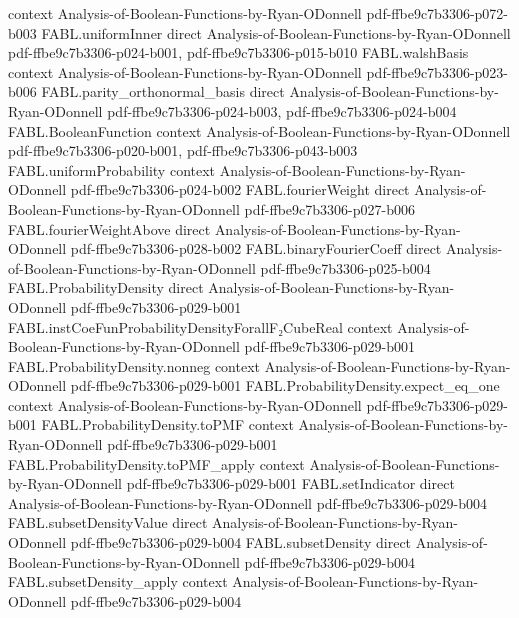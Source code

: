 \begin{theorem}
  {context}
  {Analysis-of-Boolean-Functions-by-Ryan-ODonnell}
  {pdf-ffbe9c7b3306-p072-b003}
\proofstep
  {FABL.uniformInner}
  {direct}
  {Analysis-of-Boolean-Functions-by-Ryan-ODonnell}
  {pdf-ffbe9c7b3306-p024-b001,
    pdf-ffbe9c7b3306-p015-b010}
\proofstep
  {FABL.walshBasis}
  {context}
  {Analysis-of-Boolean-Functions-by-Ryan-ODonnell}
  {pdf-ffbe9c7b3306-p023-b006}
\proofstep
  {FABL.parity_orthonormal_basis}
  {direct}
  {Analysis-of-Boolean-Functions-by-Ryan-ODonnell}
  {pdf-ffbe9c7b3306-p024-b003,
    pdf-ffbe9c7b3306-p024-b004}
\proofstep
  {FABL.BooleanFunction}
  {context}
  {Analysis-of-Boolean-Functions-by-Ryan-ODonnell}
  {pdf-ffbe9c7b3306-p020-b001,
    pdf-ffbe9c7b3306-p043-b003}
\proofstep
  {FABL.uniformProbability}
  {context}
  {Analysis-of-Boolean-Functions-by-Ryan-ODonnell}
  {pdf-ffbe9c7b3306-p024-b002}
\proofstep
  {FABL.fourierWeight}
  {direct}
  {Analysis-of-Boolean-Functions-by-Ryan-ODonnell}
  {pdf-ffbe9c7b3306-p027-b006}
\proofstep
  {FABL.fourierWeightAbove}
  {direct}
  {Analysis-of-Boolean-Functions-by-Ryan-ODonnell}
  {pdf-ffbe9c7b3306-p028-b002}
\proofstep
  {FABL.binaryFourierCoeff}
  {direct}
  {Analysis-of-Boolean-Functions-by-Ryan-ODonnell}
  {pdf-ffbe9c7b3306-p025-b004}
\proofstep
  {FABL.ProbabilityDensity}
  {direct}
  {Analysis-of-Boolean-Functions-by-Ryan-ODonnell}
  {pdf-ffbe9c7b3306-p029-b001}
\proofstep
  {FABL.instCoeFunProbabilityDensityForallF₂CubeReal}
  {context}
  {Analysis-of-Boolean-Functions-by-Ryan-ODonnell}
  {pdf-ffbe9c7b3306-p029-b001}
\proofstep
  {FABL.ProbabilityDensity.nonneg}
  {context}
  {Analysis-of-Boolean-Functions-by-Ryan-ODonnell}
  {pdf-ffbe9c7b3306-p029-b001}
\proofstep
  {FABL.ProbabilityDensity.expect_eq_one}
  {context}
  {Analysis-of-Boolean-Functions-by-Ryan-ODonnell}
  {pdf-ffbe9c7b3306-p029-b001}
\proofstep
  {FABL.ProbabilityDensity.toPMF}
  {context}
  {Analysis-of-Boolean-Functions-by-Ryan-ODonnell}
  {pdf-ffbe9c7b3306-p029-b001}
\proofstep
  {FABL.ProbabilityDensity.toPMF_apply}
  {context}
  {Analysis-of-Boolean-Functions-by-Ryan-ODonnell}
  {pdf-ffbe9c7b3306-p029-b001}
\proofstep
  {FABL.setIndicator}
  {direct}
  {Analysis-of-Boolean-Functions-by-Ryan-ODonnell}
  {pdf-ffbe9c7b3306-p029-b004}
\proofstep
  {FABL.subsetDensityValue}
  {direct}
  {Analysis-of-Boolean-Functions-by-Ryan-ODonnell}
  {pdf-ffbe9c7b3306-p029-b004}
\proofstep
  {FABL.subsetDensity}
  {direct}
  {Analysis-of-Boolean-Functions-by-Ryan-ODonnell}
  {pdf-ffbe9c7b3306-p029-b004}
\proofstep
  {FABL.subsetDensity_apply}
  {context}
  {Analysis-of-Boolean-Functions-by-Ryan-ODonnell}
  {pdf-ffbe9c7b3306-p029-b004}

\end{theorem}
